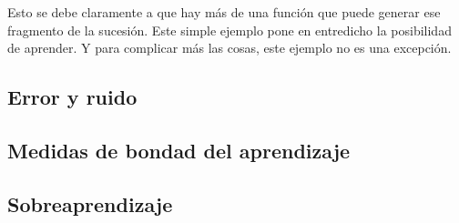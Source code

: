 Esto se debe claramente a que hay más de una función que puede generar ese fragmento de la sucesión. Este simple ejemplo pone en entredicho la posibilidad de aprender. Y para complicar más las cosas, este ejemplo no es una excepción.
\subsection{Error y ruido}
\subsection{Medidas de bondad del aprendizaje}
\subsection{Sobreaprendizaje}